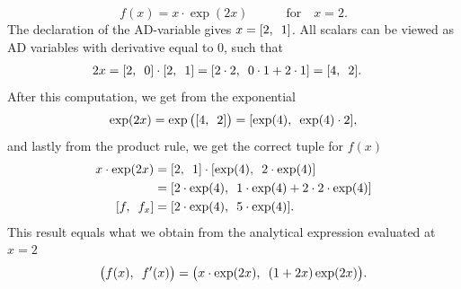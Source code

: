 \begin{equation}
    \label{eq:forwardADExample}
    f(x) = x\cdot\exp(2x) \hspace{3em} \text{for}\hspace{1em} x = 2.
\end{equation}
The declaration of the AD-variable gives $x = [2 ,\hspace{0.5em}  1]$. All scalars can be viewed as AD variables with derivative equal to 0, such that
\begin{align*}
    2x &= [ \adpair{2}{0}  ]\cdot [ \adpair{2}{1} ] %
    =[ \adpair{2\cdot2}{0\cdot1 + 2\cdot 1}  ]%
    =[ \adpair{4}{2} ].
\end{align*}
After this computation, we get from the exponential
\begin{align*}
    \exp(2x) = \exp\big([ 4,\hspace{0.5em}2 ]\big)
    = [ \exp(4),\hspace{0.5em}\exp(4)\cdot 2 ],
\end{align*}
and lastly from the product rule, we get the correct tuple for $f(x)$
\begin{align*}
    x\cdot \exp(2x) &= [\adpair{2}{1}]\cdot [\adpair{\exp(4)}{2\cdot\exp(4)}]\\
    &=[\adpair{2\cdot\exp(4)}{1\cdot\exp(4) + 2\cdot 2\cdot\exp(4)}]\\
    [\adpair{f}{f_x}] & = [ \adpair{2\cdot\exp(4)}{5\cdot\exp(4)}].
\end{align*}
This result equals what we obtain from the analytical expression evaluated at $x=2$
\begin{equation*}
    \big(f(x),\hspace{0.5em}f'(x)\big) = \big(x\cdot\exp(2x),\hspace{0.5em}(1+2x)\exp(2x)\big).
\end{equation*}


